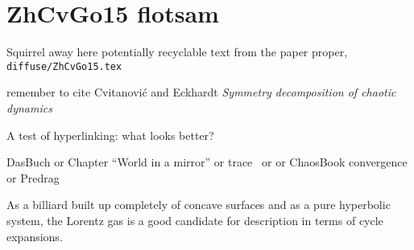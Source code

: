 
\section{ZhCvGo15 flotsam}
\label{s:flotsam}

Squirrel away here potentially recyclable text from the
paper proper, \texttt{diffuse/ZhCvGo15.tex}

remember to cite Cvitanovi\'c and Eckhardt {\em Symmetry
decomposition of chaotic dynamics}

A test of hyperlinking: what looks better?

DasBuch
or
 {Chapter ``{World} in a mirror''}
or trace~
or 
or ChaosBook convergence
or Predrag

As a billiard built up completely of concave surfaces and as a pure
hyperbolic system, the Lorentz gas is a good candidate for description in
terms of cycle expansions.
